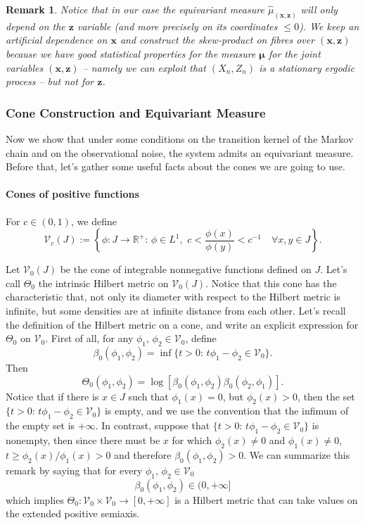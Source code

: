 \documentclass{article}
\newcommand{\1}{\mathbbm{1}}
\newcommand{\bo}{\boldsymbol}
\newcommand{\R}{\mathbb R}
\newcommand{\mc}{\mathcal}
\newtheorem{remark}[theorem]{Remark}
\begin{document}
\begin{remark}\label{staz}
 Notice that in our case the equivariant measure $\hat\mu_{(\bo x,\bo z)}$ will only depend on the $\bo z$ variable (and more precisely on its coordinates $\le 0$). We keep an artificial  dependence on $\bo x$ and construct the skew-product on fibres over $(\bo x,\bo z)$ because we have good statistical properties for the measure $\bo \mu$ for the joint variables $(\bo x, \bo z)$ -- namely we can exploit that $(X_n,Z_n)$ is a stationary ergodic process -- but not for $\bo z$. 
\end{remark}

\subsubsection{Cone Construction and Equivariant Measure}

Now we show that under some conditions on the transition kernel of the Markov chain and on the observational noise, the system admits an equivariant measure. Before that, let's gather some useful facts about the cones we are going to use.

\paragraph{Cones of positive functions}

For $c\in(0,1)$, we define 
\[
\mc V_c(J):=\left\{\phi: J\rightarrow \R^+:\,\phi\in L^1,\,\, c < \frac{\phi(x)}{\phi(y)} < c^{-1}  \quad\forall x,y\in J\right\}.
\]

Let $\mc V_0(J)$ be the cone of integrable nonnegative functions defined on $J$. 
Let's call $\Theta_{0}$ the intrinsic Hilbert metric on $\mc V_0(J)$. Notice that this cone has the characteristic that, not only its diameter with respect to the Hilbert metric is infinite, but some densities are at infinite distance from each other. Let's recall the definition of the Hilbert metric on a cone, and write an explicit expression for  $\Theta_{0}$ on $\mc V_{0}$. First of all, for any $\phi_1$, $\phi_2\in \mc V_{0}$, define
\[
\beta_{0}(\phi_1,\phi_2)=\inf\{t>0:\,t\phi_1- \phi_2\in \mc V_{0}\}.
\]
Then 
\[
\Theta_0(\phi_1,\phi_2)=\log[\beta_0(\phi_1,\phi_2)\beta_0(\phi_2,\phi_1)].
\]
Notice that if there is $x\in J$ such that $\phi_1(x)=0$, but $\phi_2(x)> 0$, then the set $\{t>0:\,t\phi_1- \phi_2\in \mc V_{0}\}$ is empty, and we use the convention that the infimum of the empty set is $+\infty$. In contrast, suppose that $\{t>0:\,t\phi_1- \phi_2\in \mc V_{0}\}$ is nonempty, then since there must be $x$ for which $\phi_2(x)\neq 0$ and $\phi_1(x)\neq 0$, $t\ge \phi_2(x)/\phi_1(x)>0$ and therefore  $\beta_{0}(\phi_1,\phi_2)>0$. We can summarize this remark by saying that for every $\phi_1,\,\phi_2\in \mc V_{0}$
\[
\beta_{0}(\phi_1,\phi_2)\in(0,+\infty]
\]
which implies  $\Theta_{0}: \mc V_{0}\times  \mc V_{0}\rightarrow[0,+\infty] $
is a Hilbert metric that can take values on the extended positive semiaxis.
\end{document}
